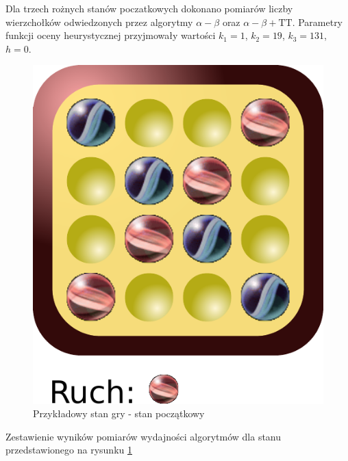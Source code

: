 \documentclass{scrartcl}
\begin{document}
Dla trzech rożnych stanów poczatkowych dokonano pomiarów liczby
wierzchołków odwiedzonych przez algorytmy $\alpha - \beta$ oraz
$\alpha - \beta + \text{TT}$. Parametry funkcji oceny heurystycznej
przyjmowały wartości $k_1 = 1$, $k_2 = 19$, $k_3 = 131$, $h = 0$.

\begin{figure}[h]
  \centering
  \includegraphics[scale=0.6]{data/position0.pdf}
  \caption{Przykładowy stan gry - stan początkowy}
  \label{fig:position0}
\end{figure}

\begin{table}[h]
  \centering
  \caption{Zestawienie wyników  pomiarów wydajności algorytmów dla stanu
    przedstawionego na rysunku \ref{fig:position0}}
  \label{table:position0}
  
\end{table}
\end{document}
